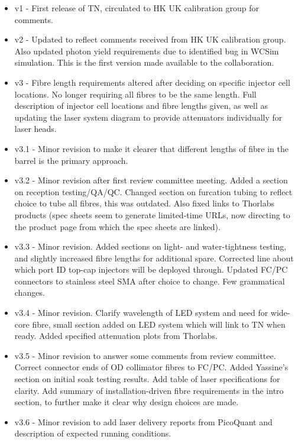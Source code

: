 \documentclass[a4paper,11pt]{article}
\begin{document}
\begin{itemize}
\item v1 - First release of TN, circulated to HK UK calibration group for comments.
\item v2 - Updated to reflect comments received from HK UK calibration group. Also updated photon yield requirements due to identified bug in WCSim simulation. This is the first version made available to the collaboration.
\item v3 - Fibre length requirements altered after deciding on specific injector cell locations. No longer requiring all fibres to be the same length. Full description of injector cell locations and fibre lengths given, as well as updating the laser system diagram to provide attenuators individually for laser heads.
\item v3.1 - Minor revision to make it clearer that different lengths of fibre in the barrel is the primary approach.
\item v3.2 - Minor revision after first review committee meeting. Added a section on reception testing/QA/QC. Changed section on furcation tubing to reflect choice to tube all fibres, this was outdated. Also fixed links to Thorlabs products (spec sheets seem to generate limited-time URLs, now directing to the product page from which the spec sheets are linked). 
\item v3.3 - Minor revision. Added sections on light- and water-tightness testing, and slightly increased fibre lengths for additional spare. Corrected line about which port ID top-cap injectors will be deployed through. Updated FC/PC connectors to stainless steel SMA after choice to change. Few grammatical changes.
\item v3.4 - Minor revision. Clarify wavelength of LED system and need for wide-core fibre, small section added on LED system which will link to TN when ready. Added specified attenuation plots from Thorlabs.
\item v3.5 - Minor revision to answer some comments from review committee. Correct connector ends of OD collimator fibres to FC/PC. Added Yassine's section on initial soak testing results. Add table of laser specifications for clarity. Add summary of installation-driven fibre requirements in the intro section, to further make it clear why design choices are made.
\item v3.6 - Minor revision to add laser delivery reports from PicoQuant and description of expected running conditions.
\end{itemize}
\end{document}
